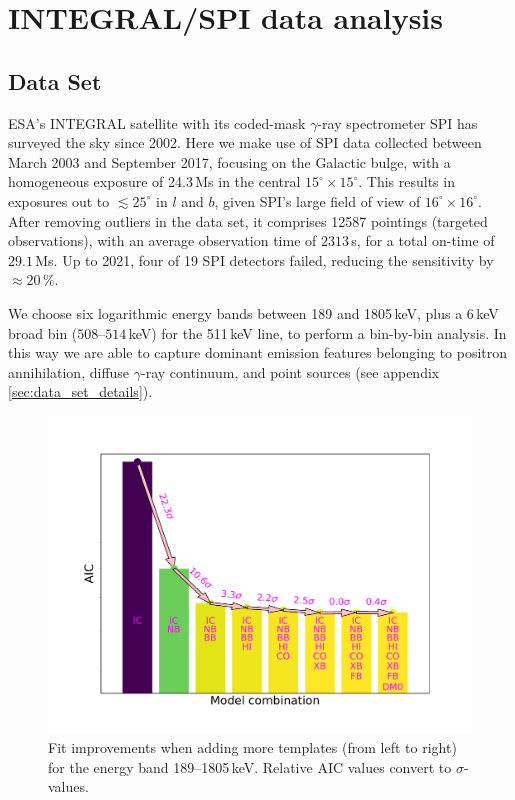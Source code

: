 \documentclass[doublespace,nopageskip]{VTthesis} %
\begin{document}
	
	
	
	\section{INTEGRAL/SPI data analysis}\label{sec:data_analysis}
	\subsection{Data Set}\label{sec:data_set}
	ESA's INTEGRAL satellite \citep{Winkler2003_INTEGRAL} with its coded-mask $\gamma$-ray spectrometer SPI \citep{Vedrenne2003_SPI} has surveyed the sky since 2002. 
	Here we make use of SPI data collected between March 2003 and September 2017, focusing on the Galactic bulge, with a homogeneous exposure of 24.3\,Ms in the central $15^{\circ} \times 15^{\circ}$.
	This results in exposures out to $\lesssim 25^{\circ}$ in $l$ and $b$, given SPI's large field of view of $16^{\circ} \times 16^{\circ}$. 
	After removing outliers in the data set, it comprises 12587 pointings (targeted observations), with an average observation time of $2313$\,s, for a total on-time of $29.1$\,Ms.
	Up to 2021, four of 19 SPI detectors failed, reducing the sensitivity by $\approx 20\,\%$.
	
	
	We choose six logarithmic energy bands between 189 and 1805\,keV, plus a 6\,keV broad bin ($508$--$514$\,keV) for the 511\,keV line, to perform a bin-by-bin analysis.
	In this way we are able to capture dominant emission features belonging to positron annihilation, diffuse $\gamma$-ray continuum, and point sources (see appendix\,\ref{sec:data_set_details}).
	
	\begin{figure}
		\centering
		\includegraphics[width=0.8\columnwidth,trim=0.10in 0.7in 0.94in 0.83in,clip=true]{Figures/511keV/bar_plot_aic_spec_new2.pdf}%
		\caption{Fit improvements when adding more templates (from left to right) for the energy band 189--1805\,keV. Relative AIC values convert to $\sigma$-values.}
		\label{fig:model_improvement_all_models}%
	\end{figure}
	
\end{document}
